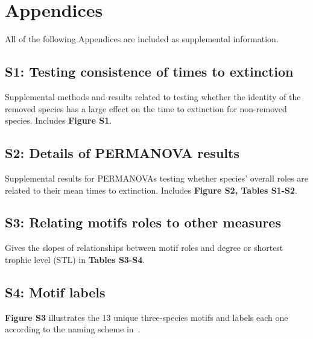 \documentclass[12pt]{article}
\begin{document}
\clearpage

\section*{Appendices}

\begin{spacing}{2.0}

All of the following Appendices are included as supplemental information.

    \subsection*{S1: Testing consistence of times to extinction}
    
        Supplemental methods and results related to testing whether the identity of the removed species has a large effect on the time to extinction for non-removed species. Includes \textbf{Figure S1}.
    
    \subsection*{S2: Details of PERMANOVA results}
        
        Supplemental results for PERMANOVAs testing whether species' overall roles are related to their mean times to extinction. Includes \textbf{Figure S2, Tables S1-S2}.
    
    \subsection*{S3: Relating motifs roles to other measures}
        
        Gives the slopes of relationships between motif roles and degree or shortest trophic level (STL) in \textbf{Tables S3-S4}.
        
    \subsection*{S4: Motif labels}
        
        \textbf{Figure S3} illustrates the 13 unique three-species motifs and labels each one according to the naming scheme in~\citet{Stouffer2007}.

\end{spacing}
\end{document}
